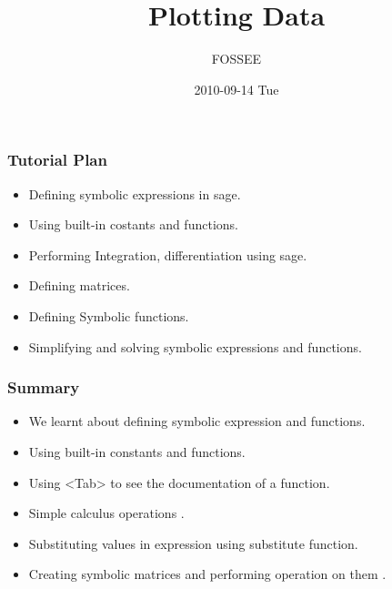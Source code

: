 \documentclass[presentation]{beamer}
\title{Plotting Data }
\author{FOSSEE}
\date{2010-09-14 Tue}
\begin{document}
\maketitle






\begin{frame}
\frametitle{Tutorial Plan}
\label{sec-1}
\begin{itemize}

\item Defining symbolic expressions in sage.\\
\label{sec-1.1}%
\item Using built-in costants and functions.\\
\label{sec-1.2}%
\item Performing Integration, differentiation using sage.\\
\label{sec-1.3}%
\item Defining matrices.\\
\label{sec-1.4}%
\item Defining Symbolic functions.\\
\label{sec-1.5}%
\item Simplifying and solving symbolic expressions and functions.\\
\label{sec-1.6}%
\end{itemize} %
\end{frame}
\begin{frame}
\frametitle{Summary}
\label{sec-2}
\begin{itemize}

\item We learnt about defining symbolic expression and functions.\\
\label{sec-2.1}%
\item Using built-in constants and functions.\\
\label{sec-2.2}%
\item Using <Tab>  to see the documentation of a function.\\
\label{sec-2.3}%
\item Simple calculus operations .\\
\label{sec-2.4}%
\item Substituting values in expression using substitute function.\\
\label{sec-2.5}%
\item Creating symbolic matrices and performing operation on them .\\
\label{sec-2.6}%
\end{itemize} %
\end{frame}
\end{document}
